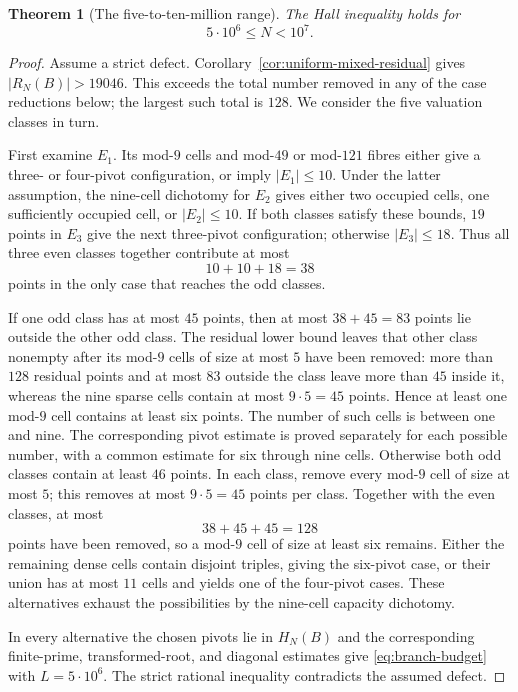 \documentclass[11pt]{article}
\newtheorem{theorem}{Theorem}[section]
\theoremstyle{definition}
\newcommand{\RN}{R_N}
\newcommand{\FiveMillion}{5\cdot10^6}
\newcommand{\TenMillion}{10^7}
\begin{document}
\begin{theorem}[The five-to-ten-million range]
\label{prop:five-million-interval-close}
The Hall inequality holds for
\[
 \FiveMillion\leq N<\TenMillion.
\]
\end{theorem}

\begin{proof}
Assume a strict defect.  Corollary~\ref{cor:uniform-mixed-residual} gives
 $|\RN(B)|>19046$.  This exceeds the total number removed in any of the case
 reductions below; the largest such total is $128$.  We consider the five
 valuation classes in turn.

First examine $E_1$.  Its mod-$9$ cells and mod-$49$ or mod-$121$ fibres
 either give a three- or four-pivot configuration, or imply $|E_1|\leq10$.
 Under the latter assumption, the nine-cell dichotomy for $E_2$ gives either
 two occupied cells, one sufficiently occupied cell, or $|E_2|\leq10$.
 If both classes satisfy these bounds, $19$ points in $E_3$ give the next
three-pivot configuration; otherwise $|E_3|\leq18$.  Thus all three even
classes together contribute at most
\[
 10+10+18=38
\]
points in the only case that reaches the odd classes.

If one odd class has at most $45$ points, then at most $38+45=83$ points lie
outside the other odd class.  The residual lower bound leaves that other
 class nonempty after its mod-$9$ cells of size at most $5$ have been removed: more than
$128$ residual points and at most $83$ outside the class leave more than $45$
inside it, whereas the nine sparse cells contain at most $9\cdot5=45$ points.
 Hence at least one mod-$9$ cell contains at least six points.  The number of
 such cells is between one and nine.  The corresponding pivot estimate is
 proved separately for each possible number, with a common estimate for six
 through nine cells.
 Otherwise both odd classes contain at least $46$ points.  In each class,
 remove every mod-$9$ cell of size at most $5$; this removes at most
$9\cdot5=45$ points per class.  Together with the even classes, at most
\[
 38+45+45=128
\]
 points have been removed, so a mod-$9$ cell of size at least six remains.
 Either the remaining dense cells contain disjoint triples, giving the
 six-pivot case, or their
union has at most $11$ cells and yields one of the four-pivot cases.  These
 alternatives exhaust the possibilities by the nine-cell capacity
 dichotomy.

 In every alternative the chosen pivots lie in $H_N(B)$ and the
corresponding finite-prime, transformed-root, and diagonal estimates give
\eqref{eq:branch-budget} with $L=\FiveMillion$.  The strict rational
inequality contradicts the assumed defect.
\end{proof}
\end{document}
